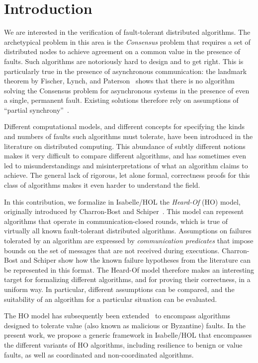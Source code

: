 \documentclass[11pt,a4paper]{article}
\begin{document}
\tableofcontents

\section{Introduction}

We are interested in the verification of fault-tolerant distributed
algorithms.  The archetypical problem in this area is the
\emph{Consensus} problem that requires a set of distributed nodes to
achieve agreement on a common value in the presence of faults.
Such algorithms are notoriously hard to design and to
get right. This is particularly true in the presence of asynchronous
communication: the landmark theorem by Fischer, Lynch, and
Paterson~\cite{FLP85} shows that there is no algorithm solving the
Consensus problem for asynchronous systems in the presence of even a
single, permanent fault. Existing solutions therefore rely on assumptions
of ``partial synchrony''~\cite{dwork:consensus}.

Different computational models, and different concepts for specifying
the kinds and numbers of faults such algorithms must tolerate, have
been introduced in the literature on distributed computing. This
abundance of subtly different notions makes it very difficult to
compare different algorithms, and has sometimes even led to
misunderstandings and misinterpretations of what an algorithm claims
to achieve. The general lack of rigorous, let alone formal,
correctness proofs for this class of algorithms makes it even harder
to understand the field.

In this contribution, we formalize in Isabelle/HOL the \emph{Heard-Of}
(HO) model, originally introduced by Charron-Bost and
Schiper~\cite{charron:heardof}. This model can represent algorithms
that operate in communication-closed rounds, which is true of
virtually all known fault-tolerant distributed algorithms. Assumptions
on failures tolerated by an algorithm are expressed by
\emph{communication predicates} that impose bounds on the set of
messages that are not received during executions. Charron-Bost and
Schiper show how the known failure hypotheses from the literature can
be represented in this format. The Heard-Of model therefore makes an
interesting target for formalizing different algorithms, and for
proving their correctness, in a uniform way. In particular, different
assumptions can be compared, and the suitability of an algorithm for a
particular situation can be evaluated.

The HO model has subsequently been extended~\cite{biely:tolerating} to
encompass algorithms designed to tolerate value (also known as
malicious or Byzantine) faults. In the present work, we propose a
generic framework in Isabelle/HOL that encompasses the different
variants of HO algorithms, including resilience to
benign or value faults, as well as coordinated and non-coordinated
algorithms.
\end{document}
